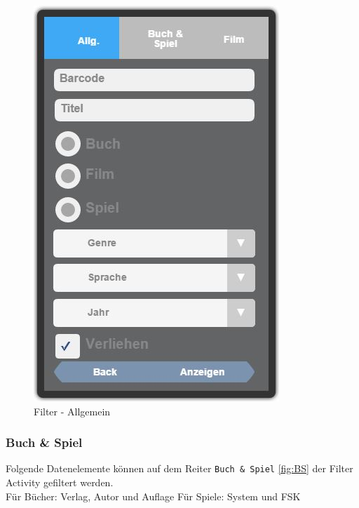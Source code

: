 \begin{figure}[htbp]
	\centering
	\includegraphics[scale=0.5]{pic/GUI/FilterAllgemein}
	\caption{Filter - Allgemein}
	\label{fig:Allgemein}
\end{figure}

\subsubsection{Buch \& Spiel}

Folgende Datenelemente können auf dem Reiter {\color{IndianRed}\texttt{Buch \& Spiel}} \ref{fig:BS} der Filter Activity gefiltert werden.\\

Für Bücher: Verlag, Autor und Auflage
Für Spiele: System und FSK

